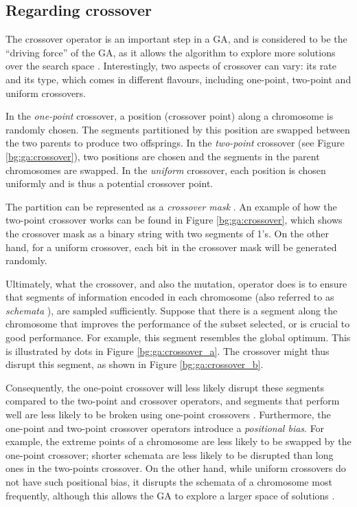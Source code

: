 \documentclass[12pt, twoside, a4paper]{report}
\begin{document}
\subsection{Regarding crossover}
The crossover operator is an important step in a GA, and is considered to be the ``driving force'' of the GA, as it allows the algorithm to explore more solutions over the search space \cite{RefWorks:223, RefWorks:226}. Interestingly, two aspects of crossover can vary: its rate and its type, which comes in different flavours, including one-point, two-point and uniform crossovers.

In the \textit{one-point} crossover, a position (crossover point) along a chromosome is randomly chosen. The segments partitioned by this position are swapped between the two parents to produce two offsprings. In the \textit{two-point} crossover (see Figure \ref{bg:ga:crossover}), two positions are chosen and the segments in the parent chromosomes are swapped. In the \textit{uniform} crossover, each position is chosen uniformly and is thus a potential crossover point.

The partition can be represented as a \textit{crossover mask} \cite{RefWorks:205}. An example of how the two-point crossover works can be found in Figure \ref{bg:ga:crossover}, which shows the crossover mask as a binary string with two segments of 1's. On the other hand, for a uniform crossover, each bit in the crossover mask will be generated randomly.

Ultimately, what the crossover, and also the mutation, operator does is to ensure that segments of information encoded in each chromosome (also referred to as \textit{schemata} \cite{RefWorks:224}), are sampled sufficiently. Suppose that there is a segment along the chromosome that improves the performance of the subset selected, or is crucial to good performance. For example, this segment resembles the global optimum. This is illustrated by dots in Figure \ref{bg:ga:crossover_a}. The crossover might thus disrupt this segment, as shown in Figure \ref{bg:ga:crossover_b}.

Consequently, the one-point crossover will less likely disrupt these segments compared to the two-point and crossover operators, and segments that perform well are less likely to be broken using one-point crossovers \cite{RefWorks:224}. Furthermore, the one-point and two-point crossover operators introduce a \textit{positional bias}. For example, the extreme points of a chromosome are less likely to be swapped by the one-point crossover; shorter schemata are less likely to be disrupted than long ones in the two-points crossover. On the other hand, while uniform crossovers do not have such positional bias, it disrupts the schemata of a chromosome most frequently, although this allows the GA to explore a larger space of solutions \cite{RefWorks:224}.
\end{document}
